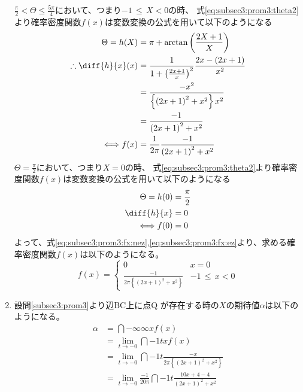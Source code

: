 \begin{enumerate}[(1)]
    $\frac{\pi}{2} < \Theta \leq \frac{5\pi}{4}$において、つまり$ -1\, \leq\, X < 0$の時、
    式\eqref{eq:subsec3:prom3:theta2}より確率密度関数$f(x)$は変数変換の公式を用いて以下のようになる
    \begin{align}
        \Theta = h(X) &= \pi + \arctan\left(\frac{2X + 1}{X}\right) \nonumber\\
        \therefore \diff{h}{x}(x) &= \frac{1}{1 + \left(\frac{2x + 1}{x}\right)^2}\frac{2x - (2x + 1)}{x^2}\nonumber\\
        &= \frac{-x^2}{\left\{\left(2x + 1\right)^2 + x^2\right\}x^2}\nonumber\\
        &= \frac{-1}{\left(2x + 1\right)^2 + x^2}\nonumber\\
        \Longleftrightarrow 
        f(x) &= \frac{1}{2\pi}\frac{-1}{\left(2x + 1\right)^2 + x^2}\label{eq:subsec3:prom3:fx:nez}
    \end{align}
    $\Theta = \frac{\pi}{2}$において、つまり$X = 0$の時、
    式\eqref{eq:subsec3:prom3:theta2}より確率密度関数$f(x)$は変数変換の公式を用いて以下のようになる
    \begin{align}
        \Theta = h(0) &= \frac{\pi}{2}\nonumber\\
        \diff{h}{x} &= 0\nonumber\\
        \Longleftrightarrow f(0) &= 0\label{eq:subsec3:prom3:fx:ez}
    \end{align}
    よって、式\eqref{eq:subsec3:prom3:fx:nez},\eqref{eq:subsec3:prom3:fx:ez}より、求める確率密度関数$f(x)$は以下のようになる。
    \begin{equation*}
        f(x) = 
        \begin{cases}
            0 & x = 0\\
            \frac{-1}{2\pi\left\{\left(2x + 1\right)^2 + x^2\right\}} & -1\, \leq\, x < 0
        \end{cases}
    \end{equation*}
    \item 設問\eqref{subsec3:prom3}より辺$\mathrm{BC}$上に点$\mathrm{Q}$
    が存在する時の$X$の期待値$\alpha$は以下のようになる。
    \begin{align*}
        \alpha &= \dint{-\infty}{\infty}{xf(x)}\\
        &= \lim_{t \to -0}\dint{-1}{t}{xf(x)}\\
        &= \lim_{t \to -0}\dint{-1}{t}{\frac{-x}{2\pi\left\{\left(2x + 1\right)^2 + x^2\right\}}}\\
        &= \lim_{t \to -0}\frac{-1}{20\pi}\dint{-1}{t}{\frac{10x + 4 - 4}{\left(2x + 1\right)^2 + x^2}}\\

\end{align*}
\end{enumerate}
